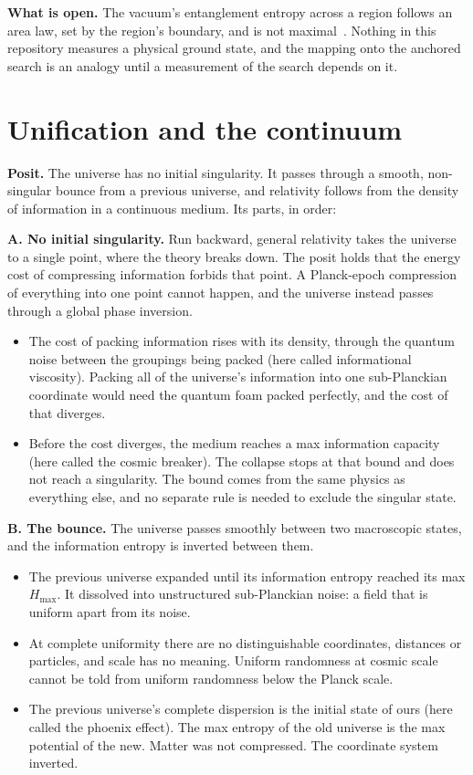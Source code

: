 \textbf{What is open.} The vacuum's entanglement entropy across a region follows an area law, set
by the region's boundary, and is not maximal~\cite{src:Srednicki-1993}. Nothing in this repository
measures a physical ground state, and the mapping onto the anchored search is an analogy until a
measurement of the search depends on it.

\section{Unification and the continuum}

\textbf{Posit.} The universe has no initial singularity. It passes through a smooth, non-singular
bounce from a previous universe, and relativity follows from the density of information in a
continuous medium. Its parts, in order:

\textbf{A. No initial singularity.} Run backward, general relativity takes the universe to a single
point, where the theory breaks down. The posit holds that the energy cost of compressing information
forbids that point. A Planck-epoch compression of everything into one point cannot happen, and the
universe instead passes through a global phase inversion.

\begin{itemize}
\item The cost of packing information rises with its density, through the quantum noise between the
groupings being packed (here called informational viscosity). Packing all of the universe's
information into one sub-Planckian coordinate would need the quantum foam packed perfectly, and the
cost of that diverges.

\item Before the cost diverges, the medium reaches a max information capacity (here called the
cosmic breaker). The collapse stops at that bound and does not reach a singularity. The bound comes
from the same physics as everything else, and no separate rule is needed to exclude the singular
state.
\end{itemize}

\textbf{B. The bounce.} The universe passes smoothly between two macroscopic states, and the
information entropy is inverted between them.

\begin{itemize}
\item The previous universe expanded until its information entropy reached its max $H_{\max}$.
It dissolved into unstructured sub-Planckian noise: a field that is uniform apart from its noise.

\item At complete uniformity there are no distinguishable coordinates, distances or particles, and
scale has no meaning. Uniform randomness at cosmic scale cannot be told from uniform randomness below
the Planck scale.

\item The previous universe's complete dispersion is the initial state of ours (here called the
phoenix effect). The max entropy of the old universe is the max potential of the new. Matter
was not compressed. The coordinate system inverted.
\end{itemize}


